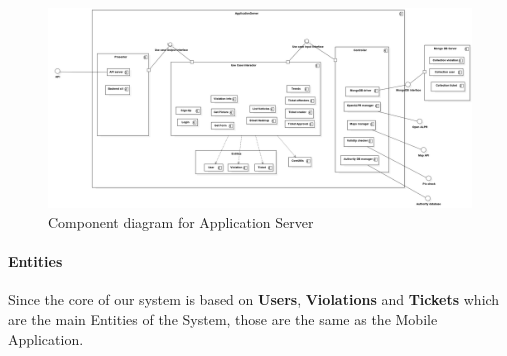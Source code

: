 \begin{figure}
\centering
\includegraphics[width=\textwidth]{Images/COMP-SERVER.png}
\caption{\label{fig:compdiag2} Component diagram for Application Server}
\end{figure}


\paragraph{Entities}
 Since the core of our system is based on \textbf{Users}, \textbf{Violations} and \textbf{Tickets} which are the main Entities of the System, those are the same as the Mobile Application.

